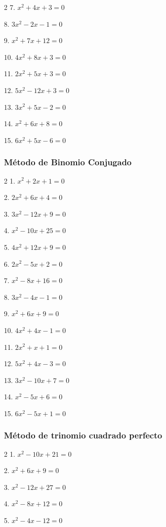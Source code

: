 \documentclass[12pt]{article}
\begin{document}
{\begin{multicols}{2}
7. $x^2 + 4x + 3 = 0$

8. $3x^2 - 2x - 1 = 0$

9. $x^2 + 7x + 12 = 0$

10. $4x^2 + 8x + 3 = 0$

11. $2x^2 + 5x + 3 = 0$

12. $5x^2 - 12x + 3 = 0$

13. $3x^2 + 5x - 2 = 0$

14. $x^2 + 6x + 8 = 0$

15. $6x^2 + 5x - 6 = 0$
\end{multicols}

\subsubsection{Método de Binomio
Conjugado}\label{muxe9todo-de-binomio-conjugado}
\begin{multicols}{2}
1. $x^2 + 2x + 1 = 0$

2. $2x^2 + 6x + 4 = 0$

3. $3x^2 - 12x + 9 = 0$

4. $x^2 - 10x + 25 = 0$

5. $4x^2 + 12x + 9 = 0$

6. $2x^2 - 5x + 2 = 0$

7. $x^2 - 8x + 16 = 0$

8. $3x^2 - 4x - 1 = 0$

9. $x^2 + 6x + 9 = 0$

10. $4x^2 + 4x - 1 = 0$

11. $2x^2 + x + 1 = 0$

12. $5x^2 + 4x - 3 = 0$

13. $3x^2 - 10x + 7 = 0$

14. $x^2 - 5x + 6 = 0$

15. $6x^2 - 5x + 1 = 0$
\end{multicols}

\subsubsection{Método de trinomio cuadrado
perfecto}\label{muxe9todo-de-trinomio-cuadrado-perfecto}
\begin{multicols}{2}
1. $x^2 - 10x + 21 = 0$

2. $x^2 + 6x + 9 = 0$

3. $x^2 - 12x + 27 = 0$

4. $x^2 - 8x + 12 = 0$

5. $x^2 - 4x - 12 = 0$


\end{multicols}}
\end{document}
